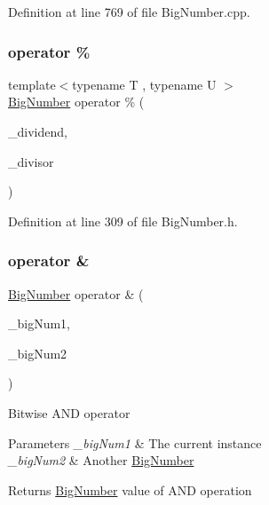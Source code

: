 Definition at line 769 of file Big\+Number.\+cpp.

\mbox{\label{class_big_nums_1_1_big_number_a17162af4b3ce281f1ac33820450986cd}} 
\subsubsection{\texorpdfstring{operator \%}{operator \%}\hspace{0.1cm}{\footnotesize\ttfamily [2/2]}}
{\footnotesize\ttfamily template$<$typename T , typename U $>$ \\
\mbox{\hyperlink{class_big_nums_1_1_big_number}{Big\+Number}} operator \% (\begin{DoxyParamCaption}\item[{const T \&}]{\+\_\+dividend,  }\item[{const U \&}]{\+\_\+divisor }\end{DoxyParamCaption})\hspace{0.3cm}{\ttfamily [friend]}}



Definition at line 309 of file Big\+Number.\+h.

\mbox{\label{class_big_nums_1_1_big_number_a177683ba51aeb898d01c71f978e7b437}} 
\subsubsection{\texorpdfstring{operator \&}{operator \&}}
{\footnotesize\ttfamily \mbox{\hyperlink{class_big_nums_1_1_big_number}{Big\+Number}} operator \& (\begin{DoxyParamCaption}\item[{const \mbox{\hyperlink{class_big_nums_1_1_big_number}{Big\+Number}} \&}]{\+\_\+big\+Num1,  }\item[{const \mbox{\hyperlink{class_big_nums_1_1_big_number}{Big\+Number}} \&}]{\+\_\+big\+Num2 }\end{DoxyParamCaption})\hspace{0.3cm}{\ttfamily [friend]}}

Bitwise A\+ND operator 
\begin{DoxyParams}{Parameters}
{\em \+\_\+big\+Num1} & The current instance \\
\hline
{\em \+\_\+big\+Num2} & Another \mbox{\hyperlink{class_big_nums_1_1_big_number}{Big\+Number}} \\
\hline
\end{DoxyParams}
\begin{DoxyReturn}{Returns}
\mbox{\hyperlink{class_big_nums_1_1_big_number}{Big\+Number}} value of A\+ND operation 
\end{DoxyReturn}


